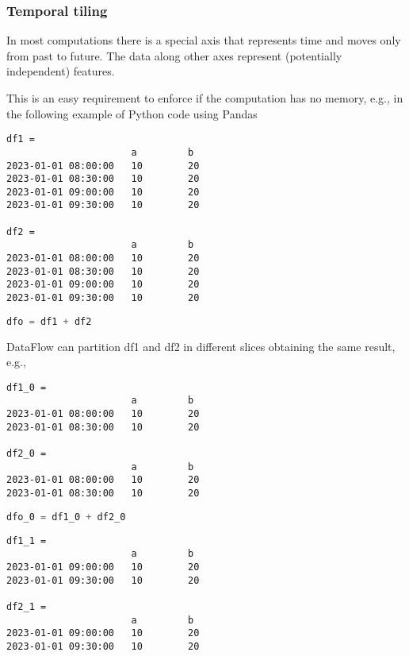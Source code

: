 \documentclass[11pt, reqno]{amsart}
\theoremstyle{definition}
\theoremstyle{remark}
\begin{document}
\subsubsection{Temporal tiling}

In most computations there is a special axis that represents time and
moves only from past to future. The data along other axes represent
(potentially independent) features.

This is an easy requirement to enforce if the computation has no memory,
e.g., in the following example of Python code using Pandas

\begin{verbatim}
df1 =
                      a         b
2023-01-01 08:00:00   10        20
2023-01-01 08:30:00   10        20
2023-01-01 09:00:00   10        20
2023-01-01 09:30:00   10        20

df2 =
                      a         b
2023-01-01 08:00:00   10        20
2023-01-01 08:30:00   10        20
2023-01-01 09:00:00   10        20
2023-01-01 09:30:00   10        20
\end{verbatim}

\begin{lstlisting}[language=Python]
dfo = df1 + df2
\end{lstlisting}

DataFlow can partition df1 and df2 in different slices obtaining the
same result, e.g.,

\begin{verbatim}
df1_0 =
                      a         b
2023-01-01 08:00:00   10        20
2023-01-01 08:30:00   10        20

df2_0 =
                      a         b
2023-01-01 08:00:00   10        20
2023-01-01 08:30:00   10        20
\end{verbatim}

\begin{lstlisting}[language=Python]
dfo_0 = df1_0 + df2_0
\end{lstlisting}

\begin{verbatim}
df1_1 =
                      a         b
2023-01-01 09:00:00   10        20
2023-01-01 09:30:00   10        20

df2_1 =
                      a         b
2023-01-01 09:00:00   10        20
2023-01-01 09:30:00   10        20
\end{verbatim}
\end{document}
